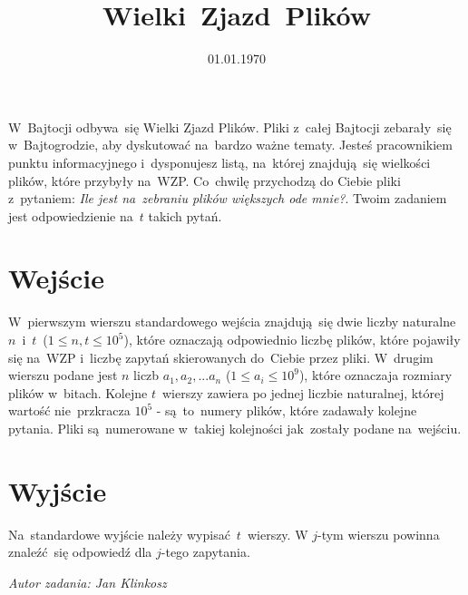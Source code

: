 \documentclass[zad]{soigstyl}
\date{01.01.1970}
\title{\mbox{Wielki Zjazd Plików}}
\begin{document}
\begin{tasktext}%
    \noindent
    W~Bajtocji odbywa~się Wielki Zjazd Plików. Pliki z~całej Bajtocji zebarały~się w~Bajtogrodzie, aby dyskutować na~bardzo ważne tematy. Jesteś pracownikiem punktu informacyjnego i~dysponujesz listą, na~której znajdują~się wielkości plików, które przybyły na~WZP. Co~chwilę przychodzą do Ciebie pliki z~pytaniem: \textit{Ile jest na~zebraniu plików większych ode mnie?}. Twoim zadaniem jest odpowiedzienie na~$t$ takich pytań.
	
    	\section{Wejście}
	W~pierwszym wierszu standardowego wejścia znajdują~się dwie liczby naturalne $n$~i~$t$~($1 \leqslant n, t \leqslant 10^5$), które oznaczają odpowiednio liczbę plików, które pojawiły się na~WZP i~liczbę zapytań skierowanych do~Ciebie przez pliki. W~drugim wierszu podane jest $n$ liczb $a_1, a_2,...a_n$ ($1 \leqslant a_i \leqslant 10^9$), które oznaczaja rozmiary plików w~bitach. Kolejne $t$~wierszy zawiera po jednej liczbie naturalnej, której wartość nie~przkracza $10^5$ - są~to~numery plików, które zadawały kolejne pytania. Pliki są~numerowane w~takiej kolejności jak~zostały podane na~wejściu.

	\section{Wyjście}
	Na~standardowe wyjście należy wypisać~$t$~wierszy. W $j$-tym wierszu powinna znaleźć~się odpowiedź dla $j$-tego zapytania.
	
	\oigprzyklady
\end{tasktext}






\begin{flushright}
\textit{Autor zadania: Jan Klinkosz}\\
\end{flushright}
\end{document}
